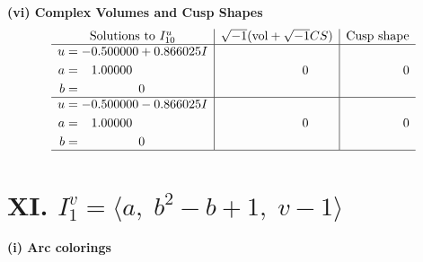 \documentclass[1p]{elsarticle_modified}
\theoremstyle{definition}
\newcommand{\I}{\sqrt{-1}}
\begin{document}
\newpage\flushleft \textbf{(vi) Complex Volumes and Cusp Shapes}
$$\begin{array}{c|c|c}  
\text{Solutions to }I^u_{10}& \I (\text{vol} + \sqrt{-1}CS) & \text{Cusp shape}\\
 \hline 
\begin{aligned}
u &= -0.500000 + 0.866025 I \\
a &= \phantom{-}1.00000\phantom{ +0.000000I} \\
b &= \phantom{-0.000000 } 0\end{aligned}
 & \phantom{-0.000000 } 0 & \phantom{-0.000000 } 0 \\ \hline\begin{aligned}
u &= -0.500000 - 0.866025 I \\
a &= \phantom{-}1.00000\phantom{ +0.000000I} \\
b &= \phantom{-0.000000 } 0\end{aligned}
 & \phantom{-0.000000 } 0 & \phantom{-0.000000 } 0\\
 \hline 
 \end{array}$$\newpage\newpage\renewcommand{\arraystretch}{1}
\centering \section*{XI. $I^v_{1}= \langle a,\;b^2- b+1,\;v-1 \rangle$}
\flushleft \textbf{(i) Arc colorings}\\
\end{document}
